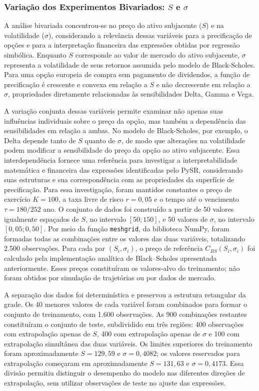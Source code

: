 \subsubsection{Variação dos Experimentos Bivariados: $S$ e $\sigma$}
A análise bivariada concentrou-se no preço do ativo subjacente ($S$) e na volatilidade ($\sigma$), considerando a relevância dessas variáveis para a precificação de opções e para a interpretação financeira das expressões obtidas por regressão simbólica. Enquanto $S$ corresponde ao valor de mercado do ativo subjacente, $\sigma$ representa a volatilidade de seus retornos assumida pelo modelo de Black-Scholes. Para uma opção europeia de compra sem pagamento de dividendos, a função de precificação é crescente e convexa em relação a $S$ e não decrescente em relação a $\sigma$, propriedades diretamente relacionadas às sensibilidades Delta, Gamma e Vega.

A variação conjunta dessas variáveis permite examinar não apenas suas influências individuais sobre o preço da opção, mas também a dependência das sensibilidades em relação a ambas. No modelo de Black-Scholes, por exemplo, o Delta depende tanto de $S$ quanto de $\sigma$, de modo que alterações na volatilidade podem modificar a sensibilidade do preço da opção ao ativo subjacente. Essa interdependência fornece uma referência para investigar a interpretabilidade matemática e financeira das expressões identificadas pelo PySR, considerando suas estruturas e sua correspondência com as propriedades da superfície de precificação. Para essa investigação, foram mantidos constantes o preço de exercício $K=100$, a taxa livre de risco $r=0{,}05$ e o tempo até o vencimento $\tau=180/252$ ano.
O conjunto de dados foi construído a partir de 50 valores igualmente espaçados de $S$, no intervalo $[50;150]$, e 50 valores de $\sigma$, no intervalo $[0{,}05;0{,}50]$. Por meio da função \texttt{meshgrid}, da biblioteca NumPy, foram formadas todas as combinações entre os valores das duas variáveis, totalizando 2.500 observações. Para cada par $(S_i,\sigma_i)$, o preço de referência $C_{BS}(S_i,\sigma_i)$ foi calculado pela implementação analítica de Black--Scholes apresentada anteriormente. Esses preços constituíram os valores-alvo do treinamento; não foram obtidos por simulação de trajetórias ou por dados de mercado.

A separação dos dados foi determinística e preservou a estrutura retangular da grade. Os 40 menores valores de cada variável foram combinados para formar o conjunto de treinamento, com 1.600 observações. As 900 combinações restantes constituíram o conjunto de teste, subdividido em três regiões: 400 observações com extrapolação apenas de $S$, 400 com extrapolação apenas de $\sigma$ e 100 com extrapolação simultânea das duas variáveis. Os limites superiores do treinamento foram aproximadamente $S=129{,}59$ e $\sigma=0{,}4082$; os valores reservados para extrapolação começaram em aproximadamente $S=131{,}63$ e $\sigma=0{,}4173$. Essa divisão permitiu distinguir o desempenho do modelo nas diferentes direções de extrapolação, sem utilizar observações de teste no ajuste das expressões.

